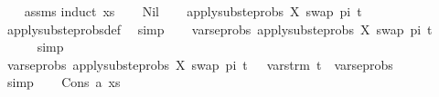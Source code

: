 \begin{isabellebody}
%
\isadelimproof
\ \ %
\endisadelimproof
%
\isatagproof
{}\isamarkupfalse%
\ assms\isanewline
{}\isamarkupfalse%
{\isacharparenleft}{\kern0pt}induct\ xs{\isacharparenright}{\kern0pt}\isanewline
\ \ \isamarkupfalse%
\ Nil\isanewline
\ \ \isamarkupfalse%
\ {\isachardoublequoteopen}apply{\isacharunderscore}{\kern0pt}subst{\isacharunderscore}{\kern0pt}eprobs\ {\isacharbrackleft}{\kern0pt}{\isacharparenleft}{\kern0pt}X{\isacharcomma}{\kern0pt}\ swap\ pi\ t{\isacharparenright}{\kern0pt}{\isacharbrackright}{\kern0pt}\ {\isacharbrackleft}{\kern0pt}{\isacharbrackright}{\kern0pt}\ {\isacharequal}{\kern0pt}\ {\isacharbrackleft}{\kern0pt}{\isacharbrackright}{\kern0pt}{\isachardoublequoteclose}\isanewline
\ \ \ \ \isamarkupfalse%
\ apply{\isacharunderscore}{\kern0pt}subst{\isacharunderscore}{\kern0pt}eprobs{\isacharunderscore}{\kern0pt}def\ \isamarkupfalse%
\ simp\isanewline
\ \ \isamarkupfalse%
\ {\isachardoublequoteopen}vars{\isacharunderscore}{\kern0pt}eprobs\ {\isacharparenleft}{\kern0pt}apply{\isacharunderscore}{\kern0pt}subst{\isacharunderscore}{\kern0pt}eprobs\ {\isacharbrackleft}{\kern0pt}{\isacharparenleft}{\kern0pt}X{\isacharcomma}{\kern0pt}\ swap\ pi\ t{\isacharparenright}{\kern0pt}{\isacharbrackright}{\kern0pt}\ {\isacharbrackleft}{\kern0pt}{\isacharbrackright}{\kern0pt}{\isacharparenright}{\kern0pt}\ {\isacharequal}{\kern0pt}\ {\isacharbraceleft}{\kern0pt}{\isacharbraceright}{\kern0pt}{\isachardoublequoteclose}\isanewline
\ \ \ \ \isamarkupfalse%
\ simp\isanewline
\ \ \isamarkupfalse%
\ {\isachardoublequoteopen}vars{\isacharunderscore}{\kern0pt}eprobs\ {\isacharparenleft}{\kern0pt}apply{\isacharunderscore}{\kern0pt}subst{\isacharunderscore}{\kern0pt}eprobs\ {\isacharbrackleft}{\kern0pt}{\isacharparenleft}{\kern0pt}X{\isacharcomma}{\kern0pt}\ swap\ pi\ t{\isacharparenright}{\kern0pt}{\isacharbrackright}{\kern0pt}\ {\isacharbrackleft}{\kern0pt}{\isacharbrackright}{\kern0pt}{\isacharparenright}{\kern0pt}\ {\isasymsubseteq}\ vars{\isacharunderscore}{\kern0pt}trm\ t\ {\isasymunion}\ vars{\isacharunderscore}{\kern0pt}eprobs\ {\isacharbrackleft}{\kern0pt}{\isacharbrackright}{\kern0pt}{\isachardoublequoteclose}\isanewline
\ \ \ \ \isamarkupfalse%
\ simp\isanewline
{}\isamarkupfalse%
\isanewline
\ \ \isamarkupfalse%
\ {\isacharparenleft}{\kern0pt}Cons\ a\ xs{\isacharparenright}{\kern0pt}\isanewline
\ \ \isamarkupfalse%

\end{isabellebody}
